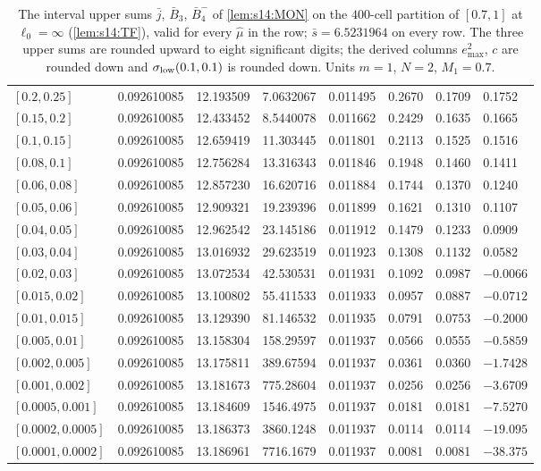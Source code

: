 \begin{table}[htbp]
\begin{tabular}{l|lll|l|lll}
$[0.2,0.25]$ & 0.092610085 & 12.193509 & 7.0632067 & 0.011495 & 0.2670 & 0.1709 & 0.1752\\
$[0.15,0.2]$ & 0.092610085 & 12.433452 & 8.5440078 & 0.011662 & 0.2429 & 0.1635 & 0.1665\\
$[0.1,0.15]$ & 0.092610085 & 12.659419 & 11.303445 & 0.011801 & 0.2113 & 0.1525 & 0.1516\\
$[0.08,0.1]$ & 0.092610085 & 12.756284 & 13.316343 & 0.011846 & 0.1948 & 0.1460 & 0.1411\\
$[0.06,0.08]$ & 0.092610085 & 12.857230 & 16.620716 & 0.011884 & 0.1744 & 0.1370 & 0.1240\\
$[0.05,0.06]$ & 0.092610085 & 12.909321 & 19.239396 & 0.011899 & 0.1621 & 0.1310 & 0.1107\\
$[0.04,0.05]$ & 0.092610085 & 12.962542 & 23.145186 & 0.011912 & 0.1479 & 0.1233 & 0.0909\\
$[0.03,0.04]$ & 0.092610085 & 13.016932 & 29.623519 & 0.011923 & 0.1308 & 0.1132 & 0.0582\\
$[0.02,0.03]$ & 0.092610085 & 13.072534 & 42.530531 & 0.011931 & 0.1092 & 0.0987 & $-0.0066$\\
$[0.015,0.02]$ & 0.092610085 & 13.100802 & 55.411533 & 0.011933 & 0.0957 & 0.0887 & $-0.0712$\\
$[0.01,0.015]$ & 0.092610085 & 13.129390 & 81.146532 & 0.011935 & 0.0791 & 0.0753 & $-0.2000$\\
$[0.005,0.01]$ & 0.092610085 & 13.158304 & 158.29597 & 0.011937 & 0.0566 & 0.0555 & $-0.5859$\\
$[0.002,0.005]$ & 0.092610085 & 13.175811 & 389.67594 & 0.011937 & 0.0361 & 0.0360 & $-1.7428$\\
$[0.001,0.002]$ & 0.092610085 & 13.181673 & 775.28604 & 0.011937 & 0.0256 & 0.0256 & $-3.6709$\\
$[0.0005,0.001]$ & 0.092610085 & 13.184609 & 1546.4975 & 0.011937 & 0.0181 & 0.0181 & $-7.5270$\\
$[0.0002,0.0005]$ & 0.092610085 & 13.186373 & 3860.1248 & 0.011937 & 0.0114 & 0.0114 & $-19.095$\\
$[0.0001,0.0002]$ & 0.092610085 & 13.186961 & 7716.1679 & 0.011937 & 0.0081 & 0.0081 & $-38.375$
\end{tabular}
\caption{The interval upper sums $\bar j$, $\bar B_3$, $\bar B_4^-$ of \cref{lem:s14:MON} on the $400$-cell partition of $[0.7,1]$ at $\ell_0=\infty$ (\cref{lem:s14:TF}), valid for every $\hat\mu$ in the row; $\bar s=6.5231964$ on every row. The three upper sums are rounded upward to eight significant digits; the derived columns $e^2_{\max}$, $c$ are rounded down and $\sigma_{\rm low}(0.1,0.1)$ is rounded down. Units $m=1$, $N=2$, $M_1=0.7$.}\label{tab:s14:T3}
\end{table}


